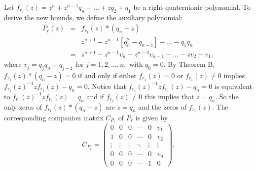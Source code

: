 \documentclass [12pt]{article}
\begin{document}
\noindent Let $f_{r_{1}}(z)=z^{n}+z^{n-1}q_{n}+\dots+zq_{2}+q_{1}$ be a right quaternionic polynomial. To derive the new bounds, we define the auxiliary polynomial:
\begin{eqnarray*}
	P_{r}(z)&=& f_{r_{1}}(z)*(q_{n} -z)\\&=&z^{n+1}-z^{n-1}[q^2_{n}-q_{n-1}]-\dots-q_{1}q_{n}\\&=& z^{n+1}-z^{n-1}v_{n}-z^{n-2}v_{n-1}-\dots- zv_{2}-v_{1},
\end{eqnarray*}
where $v_{j}=q_{j}q_{n}-q_{j-1}$ for $j=1,2,\dots,n,$ with $q_{0}=0$.
By Theorem B, $f_{r_{1}}(z)*(q_{n} -z)=0$ if and only if either $f_{r_{1}}(z)=0$ or  $f_{r_{1}}(z)\neq 0$ implies $f_{r_{1}}(z)^{-1}zf_{r_{1}}(z)- q_{n}=0$. Notice
that  $f_{r_{1}}(z)^{-1}zf_{r_{1}}(z)- q_{n}=0$ is equivalent to  $f_{r_{1}}(z)^{-1}zf_{r_{1}}(z)=q_{n}$ and if $f_{r_{1}}(z)\neq 0$ this implies that $z=q_{n}$. So the only zeros of $f_{r_{1}}(z)*(q_{n} -z)$ are $z=q_{n}$ and the zeros of $f_{r_{1}}(z)$.
The corresponding companion matrix $C_{P_{r}}$ of $P_{r}$ is given by
\[
C_{P_{r}} = 
\begin{pmatrix}
	0 & 0 & 0 & \cdots &0& v_{1} \\
	1 & 0 & 0 & \cdots &0& v_{2} \\
	\vdots & \vdots & \vdots & \ddots & \vdots&\vdots \\
	0 & 0 & 0 & \cdots &0 & v_{n} \\
	0 & 0 & 0 & \cdots &1& 0
\end{pmatrix}.
\] 
\end{document}

